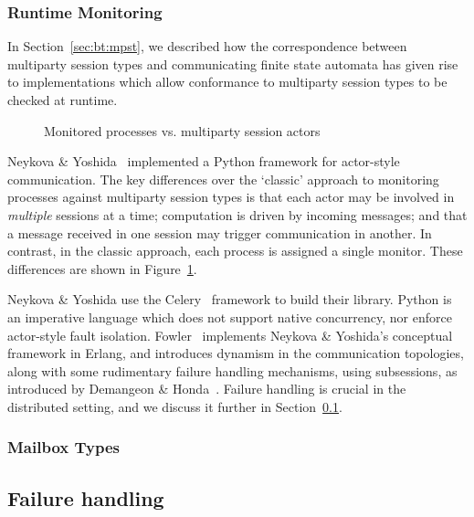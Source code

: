 \documentclass[
graybox,
envcountchap
]{svmult}
\begin{document}
\begin{bibunit}
  \subsubsection{Runtime Monitoring}
  In Section~\ref{sec:bt:mpst}, we described how the correspondence between
  multiparty session types and communicating finite state automata has given
  rise to implementations which allow conformance to multiparty session types to
  be checked at runtime.

  \begin{figure}

    \caption{Monitored processes vs. multiparty session actors}
    \label{fig:bt:mpst-actor}
  \end{figure}


  Neykova \& Yoshida~\cite{NeykovaY16:sactor} implemented a Python framework for
  actor-style communication. The key differences over the `classic' approach to
  monitoring processes against multiparty session types is that each actor may
  be involved in \emph{multiple} sessions at a time; computation is driven by
  incoming messages; and that a message received in one session may trigger
  communication in another. In contrast, in the classic approach, each process
  is assigned a single monitor. These differences are shown in
  Figure~\ref{fig:bt:mpst-actor}.

  Neykova \& Yoshida use the Celery~\cite{celery} framework to build their
  library. Python is an imperative language which does not support native
  concurrency, nor enforce actor-style fault isolation.
  Fowler~\cite{Fowler16:actors} implements Neykova \& Yoshida's conceptual
  framework in Erlang, and introduces dynamism in the communication topologies,
  along with some rudimentary failure handling
  mechanisms, using subsessions, as introduced by Demangeon \&
  Honda~\cite{DemangeonH12:subsessions}. Failure handling is crucial in the
  distributed setting, and we discuss it further in
  Section~\ref{sec:bt:failure-handling}.

  \subsubsection{Mailbox Types}

  \subsection{Failure handling}\label{sec:bt:failure-handling}


\end{bibunit}
\end{document}
